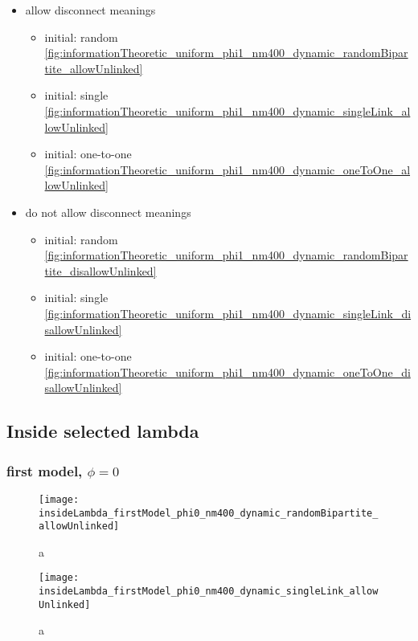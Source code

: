 \begin{itemize}
\item allow disconnect meanings
  \begin{itemize}
  \item initial: random \ref{fig:informationTheoretic_uniform_phi1_nm400_dynamic_randomBipartite_allowUnlinked}
  \item initial: single \ref{fig:informationTheoretic_uniform_phi1_nm400_dynamic_singleLink_allowUnlinked}
  \item initial: one-to-one \ref{fig:informationTheoretic_uniform_phi1_nm400_dynamic_oneToOne_allowUnlinked}
  \end{itemize}
\item do not allow disconnect meanings
  \begin{itemize}
  \item initial: random \ref{fig:informationTheoretic_uniform_phi1_nm400_dynamic_randomBipartite_disallowUnlinked}
  \item initial: single \ref{fig:informationTheoretic_uniform_phi1_nm400_dynamic_singleLink_disallowUnlinked}
  \item initial: one-to-one \ref{fig:informationTheoretic_uniform_phi1_nm400_dynamic_oneToOne_disallowUnlinked}
  \end{itemize}
\end{itemize}

\subsection{Inside selected lambda}

\subsubsection{first model, $\phi=0$}

\begin{figure}
  \centering
  \texttt{[image: insideLambda\_firstModel\_phi0\_nm400\_dynamic\_randomBipartite\_allowUnlinked]}
  \caption{a}
  \label{fig:insideLambda_firstModel_phi0_nm400_dynamic_randomBipartite_allowUnlinked}
\end{figure}

\begin{figure}
  \centering
  \texttt{[image: insideLambda\_firstModel\_phi0\_nm400\_dynamic\_singleLink\_allowUnlinked]}
  \caption{a}
  \label{fig:insideLambda_firstModel_phi0_nm400_dynamic_singleLink_allowUnlinked}
\end{figure}

